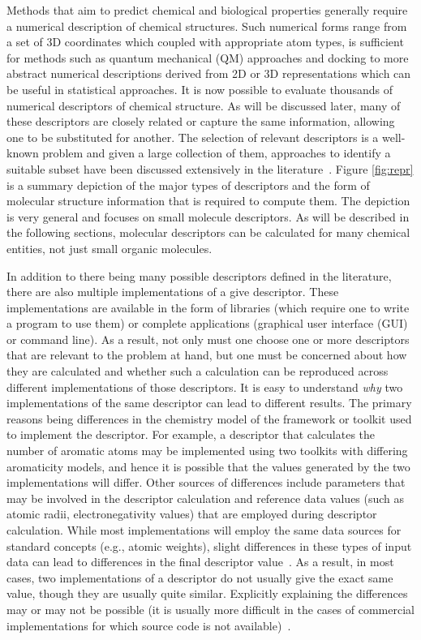 \documentclass[letterpaper, 12pt]{article}
\begin{document}
Methods that aim to predict chemical and biological properties
generally require a numerical description of chemical structures. Such
numerical forms range from a set of 3D coordinates which coupled with
appropriate atom types, is sufficient for methods such as quantum
mechanical (QM) approaches and docking to more abstract numerical
descriptions derived from 2D or 3D representations which can be useful
in statistical approaches.  It is now possible to evaluate thousands
of numerical descriptors of chemical structure. As will be discussed
later, many of these descriptors are closely related or capture the
same information, allowing one to be substituted for another. The
selection of relevant descriptors is a well-known problem and given a
large collection of them, approaches to identify a suitable subset
have been discussed extensively in the
literature~\cite{Miller:2002aa,Kohavi:1997gf}.  Figure \ref{fig:repr}
is a summary depiction of the major types of descriptors and the form
of molecular structure information that is required to compute
them. The depiction is very general and focuses on small molecule
descriptors. As will be described in the following sections, molecular
descriptors can be calculated for many chemical entities, not just
small organic molecules.

In addition to there being many possible descriptors defined in the
literature, there are also multiple implementations of a give
descriptor. These implementations are available in the form of
libraries (which require one to write a program to use them) or
complete applications (graphical user interface (GUI) or command
line). As a result, not only must one choose one or more descriptors
that are relevant to the problem at hand, but one must be concerned
about how they are calculated and whether such a calculation can be
reproduced across different implementations of those descriptors. It
is easy to understand \emph{why} two implementations of the same
descriptor can lead to different results. The primary reasons being
differences in the chemistry model of the framework or toolkit used to
implement the descriptor. For example, a descriptor that calculates
the number of aromatic atoms may be implemented using two toolkits
with differing aromaticity models, and hence it is possible that the
values generated by the two implementations will differ. Other sources
of differences include parameters that may be involved in the
descriptor calculation and reference data values (such as atomic
radii, electronegativity values) that are employed during descriptor
calculation. While most implementations will employ the same data
sources for standard concepts (e.g., atomic weights), slight
differences in these types of input data can lead to differences in
the final descriptor value~\cite{Guha:2006ac}. As a result, in most
cases, two implementations of a descriptor do not usually give the
exact same value, though they are usually quite similar. Explicitly
explaining the differences may or may not be possible (it is usually
more difficult in the cases of commercial implementations for which
source code is not available)~\cite{Spjuth2010}.
\end{document}
